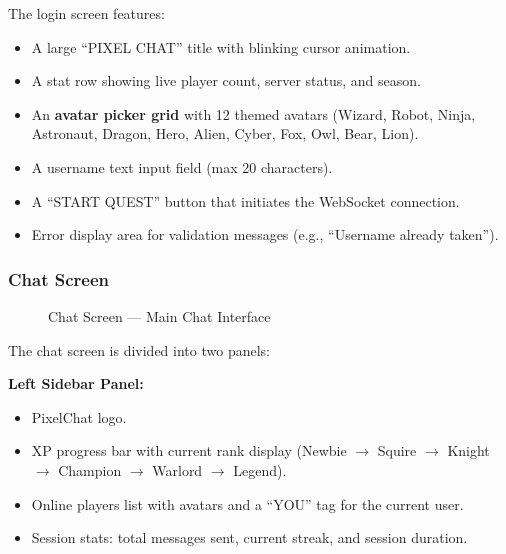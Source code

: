 \documentclass[12pt, a4paper]{article}
\begin{document}
The login screen features:
\begin{itemize}[leftmargin=*]
    \item A large ``PIXEL CHAT'' title with blinking cursor animation.
    \item A stat row showing live player count, server status, and season.
    \item An \textbf{avatar picker grid} with 12 themed avatars (Wizard, Robot, Ninja, Astronaut, Dragon, Hero, Alien, Cyber, Fox, Owl, Bear, Lion).
    \item A username text input field (max 20 characters).
    \item A ``START QUEST'' button that initiates the WebSocket connection.
    \item Error display area for validation messages (e.g., ``Username already taken'').
\end{itemize}

\subsubsection{Chat Screen}

\begin{figure}[H]
    \centering
    \caption{Chat Screen — Main Chat Interface}
    \label{fig:chat}
\end{figure}

The chat screen is divided into two panels:

\textbf{Left Sidebar Panel:}
\begin{itemize}[leftmargin=*]
    \item PixelChat logo.
    \item XP progress bar with current rank display (Newbie $\rightarrow$ Squire $\rightarrow$ Knight $\rightarrow$ Champion $\rightarrow$ Warlord $\rightarrow$ Legend).
    \item Online players list with avatars and a ``YOU'' tag for the current user.
    \item Session stats: total messages sent, current streak, and session duration.
\end{itemize}
\end{document}
